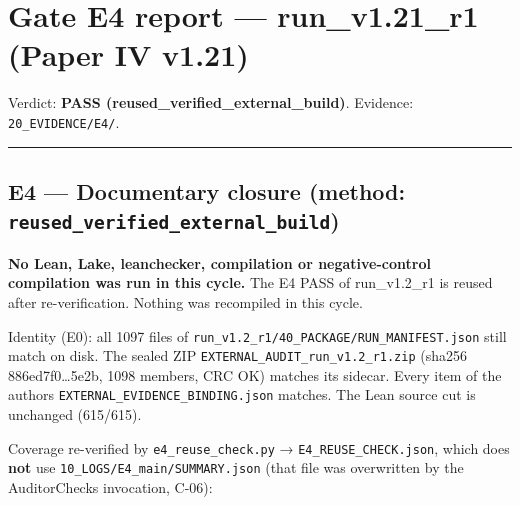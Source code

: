 \documentclass[
]{article}
\author{}
\date{}
\begin{document}
\section{Gate E4 report --- run\_v1.21\_r1 (Paper IV
v1.21)}\label{gate-e4-report--run_v121_r1-paper-iv-v121}

Verdict: \textbf{PASS (reused\_verified\_external\_build)}. Evidence:
\texttt{20\_EVIDENCE/E4/}.

\begin{center}\rule{0.5\linewidth}{0.5pt}\end{center}

\subsection{\texorpdfstring{E4 --- Documentary closure (method:
\texttt{reused\_verified\_external\_build})}{E4 --- Documentary closure (method: reused\_verified\_external\_build)}}\label{e4--documentary-closure-method-reused_verified_external_build}

\textbf{No Lean, Lake, leanchecker, compilation or negative-control
compilation was run in this cycle.} The E4 PASS of run\_v1.2\_r1 is
reused after re-verification. Nothing was recompiled in this cycle.

Identity (E0): all 1097 files of
\texttt{run\_v1.2\_r1/40\_PACKAGE/RUN\_MANIFEST.json} still match on
disk. The sealed ZIP \texttt{EXTERNAL\_AUDIT\_run\_v1.2\_r1.zip} (sha256
886ed7f0\ldots5e2b, 1098 members, CRC OK) matches its sidecar. Every
item of the author\textquotesingle s
\texttt{EXTERNAL\_EVIDENCE\_BINDING.json} matches. The Lean source cut
is unchanged (615/615).

Coverage re-verified by \texttt{e4\_reuse\_check.py} →
\texttt{E4\_REUSE\_CHECK.json}, which does \textbf{not} use
\texttt{10\_LOGS/E4\_main/SUMMARY.json} (that file was overwritten by
the AuditorChecks invocation, C-06):
\end{document}
